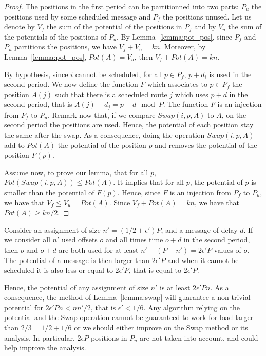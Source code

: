 \documentclass[10pt, conference, letterpaper]{IEEEtran}
\begin{document}
\begin{proof}
The positions in the first period can be partitionned into two parts: $P_{u}$ the positions used by some scheduled message and $P_{f}$ the positions unused.
Let us denote by $V_f$ the sum of the potential of the positions in $P_f$ and by $V_u$ the sum of the potentials of the positions of $P_u$. By Lemma~\ref{lemma:pot_pos}, since $P_f$ and $P_u$ partitions the positions, we have $V_f + V_u = kn$. Moreover, by Lemma~\ref{lemma:pot_pos}, $Pot(A) = V_u$, then $V_f + Pot(A) = kn$.

By hypothesis, since $i$ cannot be scheduled, for all $p \in P_{f}$, $p+d_i$ is used in the second period. We now define the function $F$ which associates to $p \in P_{f}$ the position $A(j)$ such that there is a scheduled route $j$ which uses $p+d$ in the second period, that is $A(j) + d_j = p + d \mod P$. The function $F$ is an injection from $P_{f}$ to $P_u$. Remark now that, if we compare $Swap(i,p,A)$ to $A$, on the second period the positions are used. Hence, the potential of each position stay the same after the swap. As a consequence, doing the operation $Swap(i,p,A)$ add to $Pot(A)$ the potential of the position $p$ and removes the potential of the position $F(p)$. 

Assume now, to prove our lemma, that for all $p$, $Pot(Swap(i,p,A)) \leq Pot(A)$. It implies that for all $p$, the potential of $p$ is smaller than the potential of $F(p)$. Hence, since $F$ is an injection from $P_f$ to $P_u$, we have that $V_f \leq V_u = Pot(A)$. Since $V_f + Pot(A) = kn$, we have that $Pot(A) \geq kn/2$.
\end{proof}

Consider an assignment of size $n' = (1/2 + \epsilon')P$, and a message of delay $d$.
If we consider all $n'$ used offsets $o$ and all times time $o+d$ in the second period, 
then $o$ and $o+d$ are both used for at least $n' - (P -n') = 2\epsilon' P$ values of $o$.
The potential of a message is then larger than $2\epsilon' P$ and when it cannot be scheduled
it is also less or equal to $2\epsilon' P$, that is equal to $2\epsilon' P$.

Hence, the potential of any assignment of size $n'$ is at least $2\epsilon' P n $. As a consequence, the method of Lemma~\ref{lemma:swap} will guarantee a non trivial potential for $2\epsilon' P n <  nn'/2$, that is $\epsilon' < 1/6$. Any algorithm relying on the potential and the Swap operation cannot be guaranteed to work for load larger than $2/3 = 1/2 + 1/6$ or we should either improve on the Swap method or its analysis. In particular, $2\epsilon P$ positions in $P_{u}$
are not taken into account, and could help improve the analysis.
\end{document}
